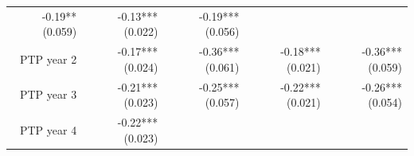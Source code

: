 \documentclass[]{article}
\begin{document}
\begin{longtable}[c]{@{}rrrrr@{}}
\begin{minipage}[t]{0.16\columnwidth}
-0.19** (0.059)
\strut\end{minipage} &
\begin{minipage}[t]{0.21\columnwidth}\raggedleft\strut
-0.13*** (0.022)
\strut\end{minipage} &
\begin{minipage}[t]{0.15\columnwidth}\raggedleft\strut
-0.19*** (0.056)
\strut\end{minipage}\tabularnewline
\begin{minipage}[t]{0.17\columnwidth}\raggedleft\strut
PTP year 2
\strut\end{minipage} &
\begin{minipage}[t]{0.18\columnwidth}\raggedleft\strut
-0.17*** (0.024)
\strut\end{minipage} &
\begin{minipage}[t]{0.16\columnwidth}\raggedleft\strut
-0.36*** (0.061)
\strut\end{minipage} &
\begin{minipage}[t]{0.21\columnwidth}\raggedleft\strut
-0.18*** (0.021)
\strut\end{minipage} &
\begin{minipage}[t]{0.15\columnwidth}\raggedleft\strut
-0.36*** (0.059)
\strut\end{minipage}\tabularnewline
\begin{minipage}[t]{0.17\columnwidth}\raggedleft\strut
PTP year 3
\strut\end{minipage} &
\begin{minipage}[t]{0.18\columnwidth}\raggedleft\strut
-0.21*** (0.023)
\strut\end{minipage} &
\begin{minipage}[t]{0.16\columnwidth}\raggedleft\strut
-0.25*** (0.057)
\strut\end{minipage} &
\begin{minipage}[t]{0.21\columnwidth}\raggedleft\strut
-0.22*** (0.021)
\strut\end{minipage} &
\begin{minipage}[t]{0.15\columnwidth}\raggedleft\strut
-0.26*** (0.054)
\strut\end{minipage}\tabularnewline
\begin{minipage}[t]{0.17\columnwidth}\raggedleft\strut
PTP year 4
\strut\end{minipage} &
\begin{minipage}[t]{0.18\columnwidth}\raggedleft\strut
-0.22*** (0.023)
\strut\end{minipage} &
\begin{minipage}[t]{0.16\columnwidth}\raggedleft\strut

\end{minipage}
\end{longtable}
\end{document}
